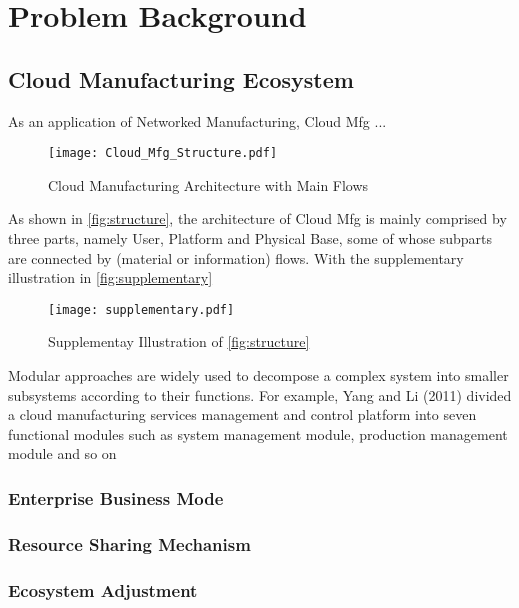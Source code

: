 \section{Problem Background} %
\label{sec:problem_background}

\subsection{Cloud Manufacturing Ecosystem} %
\label{sub:cloud_manufacturing_ecosystem}
As an application of Networked Manufacturing, Cloud Mfg ...
\begin{figure}
\texttt{[image: Cloud\_Mfg\_Structure.pdf]}
\caption{Cloud Manufacturing Architecture with Main Flows}
\label{fig:structure}
\end{figure}

As shown in \autoref{fig:structure}, the architecture of Cloud Mfg is mainly comprised by three parts, namely User, Platform and Physical Base, some of whose subparts are connected by (material or information) flows. With the supplementary illustration in \autoref{fig:supplementary}

\begin{figure}[!htpd]
\texttt{[image: supplementary.pdf]}
\caption{Supplementay Illustration of \autoref{fig:structure}}
\label{fig:supplementary}
\end{figure}

Modular approaches are widely used to decompose a complex system into smaller subsystems according to their functions. For example, Yang and Li (2011) divided a cloud manufacturing services management and control platform into seven functional modules such as system management module, production management module and so on

\subsubsection{Enterprise Business Mode}

\subsubsection{Resource Sharing Mechanism}

\subsubsection{Ecosystem Adjustment}

